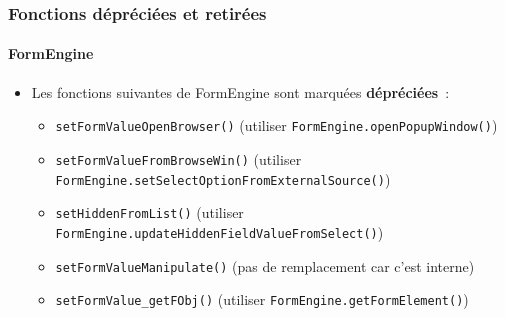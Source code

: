 
\begin{frame}[fragile]
	\frametitle{Fonctions dépréciées et retirées}
	\framesubtitle{FormEngine}

	\lstset{basicstyle=\tiny\ttfamily}

	\begin{itemize}
		\item Les fonctions suivantes de FormEngine sont marquées \textbf{dépréciées}~:

			\begin{itemize}
				\item \texttt{setFormValueOpenBrowser()}\newline
					\smaller(utiliser \texttt{FormEngine.openPopupWindow()})\small

				\item \texttt{setFormValueFromBrowseWin()}\newline
					\smaller(utiliser \texttt{FormEngine.setSelectOptionFromExternalSource()})\small

				\item \texttt{setHiddenFromList()}\newline
					\smaller(utiliser \texttt{FormEngine.updateHiddenFieldValueFromSelect()})\small

				\item \texttt{setFormValueManipulate()}\newline
					\smaller(pas de remplacement car c'est interne)\small

				\item \texttt{setFormValue\_getFObj()}\newline
					\smaller(utiliser \texttt{FormEngine.getFormElement()})\small

			\end{itemize}

	\end{itemize}

\end{frame}


